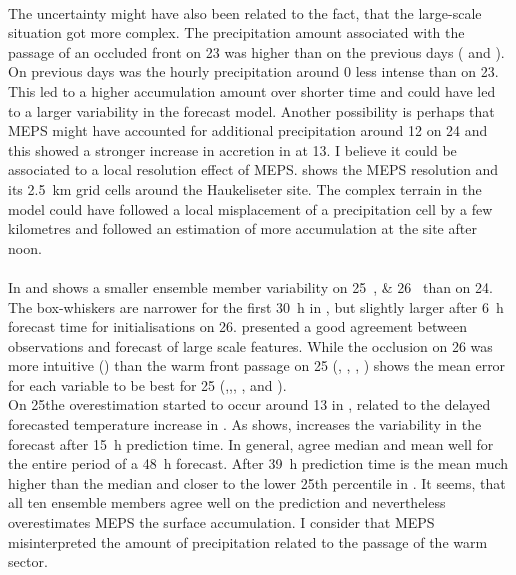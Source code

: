 \\
The uncertainty might have also been related to the fact, that the large-scale situation got more complex. The precipitation amount associated with the passage of an occluded front on \SI{23}{\dec} was higher than on the previous days ( and ). On previous days was the hourly precipitation around \SI{0}{\UTC} less intense than on \SI{23}{\dec}. This led to a higher accumulation amount over shorter time and could have led to a larger variability in the forecast model. Another possibility is perhaps that MEPS might have accounted for additional precipitation around \SI{12}{\UTC} on \SI{24}{\dec} and this showed a stronger increase in accretion in  at \SI{13}{\UTC}. I believe it could be associated to a local resolution effect of MEPS.  shows the MEPS resolution and its \SI{2.5}{\km} grid cells around the Haukeliseter site. The complex terrain in the model could have followed a local misplacement of a precipitation cell by a few kilometres and followed an estimation of more accumulation at the site after noon.
\\
\\
In  and  shows a smaller ensemble member variability on \SIlist{25;26}{\dec} than on \SI{24}{\dec}. The box-whiskers are narrower for the first \SI{30}{\hour} in , but slightly larger after \SI{6}{\hour} forecast time for initialisations on \SI{26}{\dec}.  presented a good agreement between observations and forecast of large scale features. While the occlusion on \SI{26}{\dec} was more intuitive () than the warm front passage on \SI{25}{\dec} (, , , ) shows the mean error for each variable to be best for \SI{25}{\dec} (,,, , and ).
\\
On \SI{25}{\dec}the overestimation started to occur around \SI{13}{\UTC} in , related to the delayed forecasted temperature increase in .  As  shows, increases the variability in the forecast after \SI{15}{\hour} prediction time. In general, agree median and mean well for the entire period of a \SI{48}{\hour} forecast. After \SI{39}{\hour} prediction time is the mean much higher than the median and closer to the lower 25th percentile in . It seems, that all ten ensemble members agree well on the prediction and nevertheless overestimates MEPS the surface accumulation. I consider that MEPS misinterpreted the amount of precipitation related to the passage of the warm sector.  
